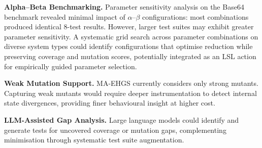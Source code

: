 \textbf{Alpha--Beta Benchmarking.} Parameter sensitivity analysis on the Base64 benchmark revealed minimal impact of $\alpha$--$\beta$ configurations: most combinations produced identical 8-test results. However, larger test suites may exhibit greater parameter sensitivity. A systematic grid search across parameter combinations on diverse system types could identify configurations that optimise reduction while preserving coverage and mutation scores, potentially integrated as an LSL action for empirically guided parameter selection.

\textbf{Weak Mutation Support.} MA-EHGS currently considers only strong mutants. Capturing weak mutants would require deeper instrumentation to detect internal state divergences, providing finer behavioural insight at higher cost.

\textbf{LLM-Assisted Gap Analysis.} Large language models could identify and generate tests for uncovered coverage or mutation gaps, complementing minimisation through systematic test suite augmentation.

